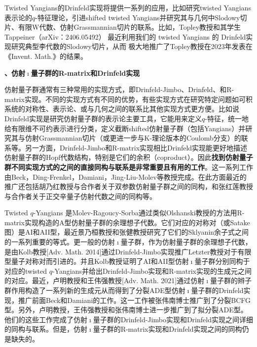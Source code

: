 \documentclass[12pt,UTF8,AutoFakeBold=4,a4paper]{ctexart}
\begin{document}
Twisted Yangians的Drinfeld实现将提供一系列的应用，比如研究twisted Yangians表示论的$q$-特征理论，引进shifted twisted Yangians并研究其与几何中Slodowy切片、有限W代数、仿射Grassmannian切片的联系。比如，Topley教授和其学生Tappeiner（arXiv：2406.05492） 最近利用我们的 twisted Yangians 的 Drinfeld实现研究典型李代数的Slodowy切片，从而 极大地推广了Topley教授在2023年发表在《Invent. Math.》的结果。




\medskip

\textbf{、仿射$\imath$量子群的R-matrix和Drinfeld实现}

仿射量子群通常有三种常用的实现方式，即Drinfeld-Jimbo、Drinfeld、和R-matrix实现。不同的实现方式有不同的优势，有些实现方式在研究特定问题如可积系统的对称性、表示论、或与几何之间的联系比其他实现方式更方便。比如说Drinfeld实现是研究仿射量子群的表示论主要工具，它能用来定义$q$-特征，统一地给有限维不可约表示进行分类，定义截断shifted仿射量子群（包括Yangians）并研究其与仿射Grassmannian切片（或更进一步与K-理论版本的Coulomb分支）的联系等。另一方面，Drinfeld-Jimbo和R-matrix实现相比Drinfeld实现能更好地描述仿射量子群的Hopf代数结构，特别是它们的余积（coproduct）。因此\textbf{找到仿射量子群不同实现方式的之间的直接同构与联系是非常重要且有用的工作}。这一系列工作由Beck，Ding-Frenkel，Damiani，Jing-Liu-Molev等教授完成。在此方面最近的推广还包括胡乃红教授与合作者关于双参数仿射量子群之间的同构，和张红莲教授与合作者关于正交辛量子仿射代数之间的同构等。

Twisted $q$-Yangians 是Molev-Ragoucy-Sorba通过类似Olshanski教授的方法用R-matrix实现构造的A型仿射量子群的余理想子代数。它们对应的对称对（或Satake图）是AI和AII型，最近景乃桓教授和张健教授研究了它们的Sklyanin余子式之间的一系列重要的等式。更一般的仿射$\imath$量子群，作为仿射量子群的余理想子代数，是由Kolb教授[Adv. Math. 2014]通过Drinfeld-Jimbo实现推广Letzter教授对于有限型量子对称对而引进的。并且Kolb教授证明了AI和AII型仿射$\imath$量子群分别同构于对应的twisted $q$-Yangians并给出Drinfeld-Jimbo实现和R-matrix实现的生成元之间的对应。最近，卢明教授和王伟强教授[Adv. Math. 2021]通过仿射$\imath$量子群的辫子群作用构造了一系列新的生成元从而得到了分裂ADE型仿射$\imath$量子群的Drinfeld实现，推广前面Beck和Damiani的工作。这一工作被张伟南博士推广到了分裂BCFG型。另外，卢明教授，王伟强教授和张伟南博士进一步推广到了拟分裂ADE型。他们的这些工作完成了仿射$\imath$量子群的Drinfeld-Jimbo实现和Drinfeld实现之间详细的同构与联系。但是，仿射$\imath$量子群的R-matrix实现和Drinfeld实现之间的同构仍是缺失的。
\end{document}
